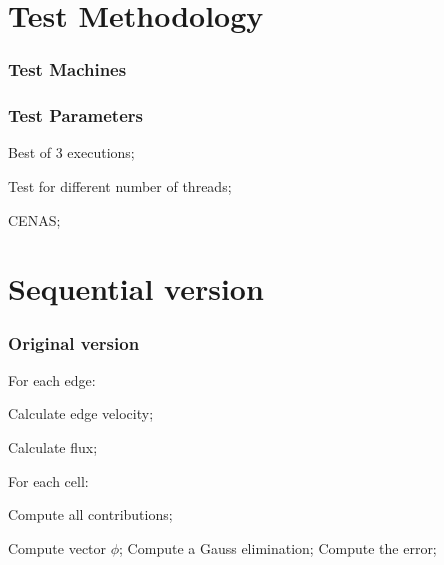 \documentclass{beamer}
\begin{document}
\section{Test Methodology}
\begin{frame}[plain]
	\frametitle{Test Machines}
		\begin{center}

			\begin{table}[!htp]
			\caption{Test cases}
			\label{tab:testcases}
			\end{table}
		\end{center}
\end{frame}

\begin{frame}[plain]
	\frametitle{Test Parameters}
	\begin{description}
		\item Best of 3 executions;
		\item Test for different number of threads;
		\item CENAS;
	\end{description}
\end{frame}


\section{Sequential version}
\begin{frame}
	\frametitle{Original version}
	For each edge:
	\begin{description}
		\item Calculate edge velocity;
		\item Calculate flux;
	\end{description}
	For each cell:
	\begin{description}
		\item Compute all contributions;
	\end{description}
	Compute vector $\phi$;
	Compute a Gauss elimination;
	Compute the error;
\end{frame}
\end{document}
